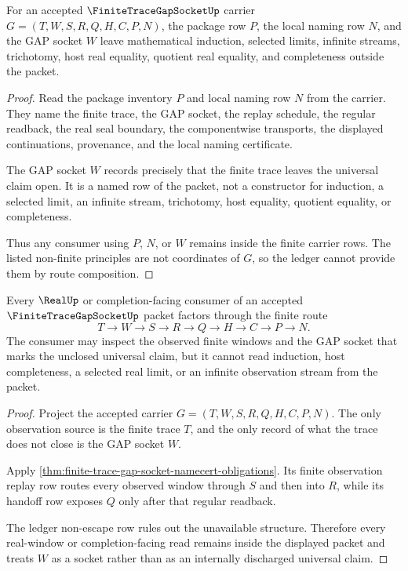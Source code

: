 \begin{theorem}
\label{thm:finite-trace-gap-socket-ledger-nonescape}
For an accepted $\FiniteTraceGapSocketUp$ carrier $G=(T,W,S,R,Q,H,C,P,N)$, the package row $P$, the local naming row $N$, and the GAP socket $W$ leave mathematical induction, selected limits, infinite streams, trichotomy, host real equality, quotient real equality, and completeness outside the packet.
\end{theorem}
\begin{proof}
Read the package inventory $P$ and local naming row $N$ from the carrier. They name the finite trace, the GAP socket, the replay schedule, the regular readback, the real seal boundary, the componentwise transports, the displayed continuations, provenance, and the local naming certificate.

The GAP socket $W$ records precisely that the finite trace leaves the universal claim open. It is a named row of the packet, not a constructor for induction, a selected limit, an infinite stream, trichotomy, host equality, quotient equality, or completeness.

Thus any consumer using $P$, $N$, or $W$ remains inside the finite carrier rows. The listed non-finite principles are not coordinates of $G$, so the ledger cannot provide them by route composition.
\end{proof}

\begin{theorem}
\label{thm:finite-trace-gap-socket-real-window-boundary}
Every $\RealUp$ or completion-facing consumer of an accepted $\FiniteTraceGapSocketUp$ packet factors through the finite route
$$
T \to W \to S \to R \to Q \to H \to C \to P \to N.
$$
The consumer may inspect the observed finite windows and the GAP socket that marks the unclosed universal claim, but it cannot read induction, host completeness, a selected real limit, or an infinite observation stream from the packet.
\end{theorem}
\begin{proof}
Project the accepted carrier $G=(T,W,S,R,Q,H,C,P,N)$. The only observation source is the finite trace $T$, and the only record of what the trace does not close is the GAP socket $W$.

Apply \autoref{thm:finite-trace-gap-socket-namecert-obligations}. Its finite observation replay row routes every observed window through $S$ and then into $R$, while its handoff row exposes $Q$ only after that regular readback.

The ledger non-escape row rules out the unavailable structure. Therefore every real-window or completion-facing read remains inside the displayed packet and treats $W$ as a socket rather than as an internally discharged universal claim.
\end{proof}

